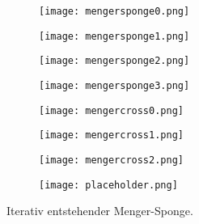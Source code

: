 \begin{figure}[!htbp]\centering
    \begin{subfigure}[t]{0.11\textwidth}
        \texttt{[image: mengersponge0.png]}
        \caption{}
        \label{fig:menger:sponge0}
    \end{subfigure}
    \hfill
    \begin{subfigure}[t]{0.11\textwidth}
        \centering
        \texttt{[image: mengersponge1.png]}
        \caption{}
        \label{fig:menger:sponge1}
    \end{subfigure}
    \hfill
    \begin{subfigure}[t]{0.11\textwidth}
        \centering
        \texttt{[image: mengersponge2.png]}
        \caption{}
        \label{fig:menger:sponge2}
    \end{subfigure}
    \hfill
    \begin{subfigure}[t]{0.11\textwidth}
        \centering
        \texttt{[image: mengersponge3.png]}
        \caption{}
        \label{fig:menger:sponge3}
    \end{subfigure}
    \begin{subfigure}[t]{0.11\textwidth}
        \centering
        \texttt{[image: mengercross0.png]}
        \caption{}
        \label{fig:menger:cross0}
    \end{subfigure}
    \hfill
    \begin{subfigure}[t]{0.11\textwidth}
        \centering
        \texttt{[image: mengercross1.png]}
        \caption{}
        \label{fig:menger:cross1}
    \end{subfigure}
    \hfill
    \begin{subfigure}[t]{0.11\textwidth}
        \centering
        \texttt{[image: mengercross2.png]}
        \caption{}
        \label{fig:menger:cross2}
    \end{subfigure}
    \begin{subfigure}[t]{0.11\textwidth}
        \centering
        \texttt{[image: placeholder.png]}
    \end{subfigure}
    \caption{Iterativ entstehender Menger-Sponge.}
    \label{fig:menger}
\end{figure}

